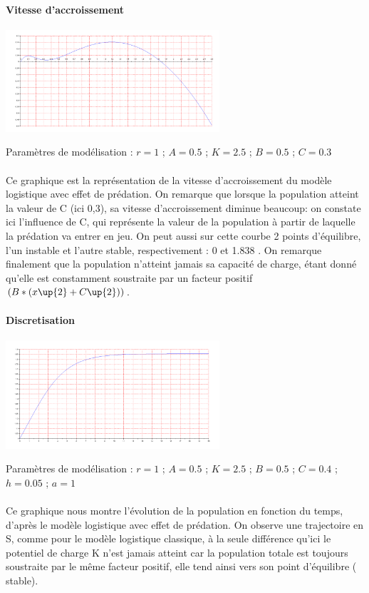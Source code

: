 \documentclass{article}
\begin{document}
\paragraph{Vitesse d'accroissement}
\begin{center}
\includegraphics[width=300px]{img/part2/Log.png}
\end{center}
Paramètres de modélisation : $r=1$ ; $A=0.5$ ; $K=2.5$ ; $B=0.5$ ; $C=0.3$
\paragraph{}
Ce graphique est la représentation de la vitesse d'accroissement du modèle logistique avec effet de prédation.
On remarque que lorsque la population atteint la valeur de C (ici 0,3), sa vitesse d'accroissement diminue beaucoup: on constate ici l'influence de C, qui représente la valeur de la population à partir de laquelle la prédation va entrer en jeu.
On peut aussi sur cette courbe 2 points d'équilibre, l'un instable et l'autre stable, respectivement : 0 et 1.838 .
On remarque finalement que la population n'atteint jamais sa capacité de charge, étant donné qu'elle est constamment soustraite par un facteur positif $( B * (x\up{2} +C\up{2}))$.

\paragraph{Discretisation}
\begin{center}
\includegraphics[width=300px]{img/part2/Traj.png}
\end{center}
Paramètres de modélisation : $r=1$ ; $A=0.5$ ; $K=2.5$ ; $B=0.5$ ; $C=0.4$ ; $h=0.05$ ; $a=1$
\paragraph{}
Ce graphique nous montre l'évolution de la population en fonction du temps, d'après le modèle logistique avec effet de prédation. On observe une trajectoire en S, comme pour le modèle logistique classique, à la seule différence qu'ici le potentiel de charge K n'est jamais atteint car la population totale est toujours soustraite par le même facteur positif, elle tend ainsi vers son point d'équilibre ( stable).
\end{document}

